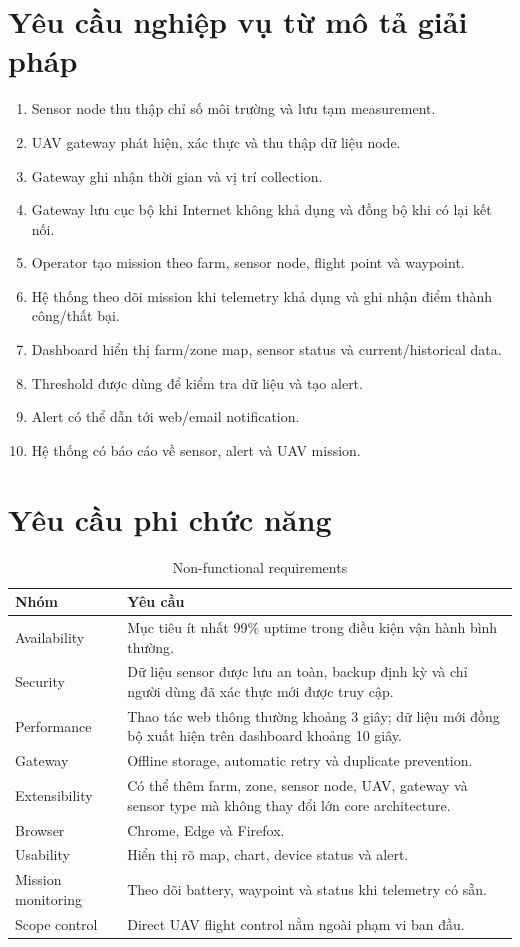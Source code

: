 \section{Yêu cầu nghiệp vụ từ mô tả giải pháp}
\begin{enumerate}
\item Sensor node thu thập chỉ số môi trường và lưu tạm measurement.
\item UAV gateway phát hiện, xác thực và thu thập dữ liệu node.
\item Gateway ghi nhận thời gian và vị trí collection.
\item Gateway lưu cục bộ khi Internet không khả dụng và đồng bộ khi có lại kết nối.
\item Operator tạo mission theo farm, sensor node, flight point và waypoint.
\item Hệ thống theo dõi mission khi telemetry khả dụng và ghi nhận điểm thành công/thất bại.
\item Dashboard hiển thị farm/zone map, sensor status và current/historical data.
\item Threshold được dùng để kiểm tra dữ liệu và tạo alert.
\item Alert có thể dẫn tới web/email notification.
\item Hệ thống có báo cáo về sensor, alert và UAV mission.
\end{enumerate}

\section{Yêu cầu phi chức năng}
\begin{table}[H]
\centering
\caption{Non-functional requirements}
\begin{tabularx}{\textwidth}{p{3.2cm}X}
\toprule
Nhóm & Yêu cầu\\
\midrule
Availability & Mục tiêu ít nhất 99\% uptime trong điều kiện vận hành bình thường.\\
Security & Dữ liệu sensor được lưu an toàn, backup định kỳ và chỉ người dùng đã xác thực mới được truy cập.\\
Performance & Thao tác web thông thường khoảng 3 giây; dữ liệu mới đồng bộ xuất hiện trên dashboard khoảng 10 giây.\\
Gateway & Offline storage, automatic retry và duplicate prevention.\\
Extensibility & Có thể thêm farm, zone, sensor node, UAV, gateway và sensor type mà không thay đổi lớn core architecture.\\
Browser & Chrome, Edge và Firefox.\\
Usability & Hiển thị rõ map, chart, device status và alert.\\
Mission monitoring & Theo dõi battery, waypoint và status khi telemetry có sẵn.\\
Scope control & Direct UAV flight control nằm ngoài phạm vi ban đầu.\\
\bottomrule
\end{tabularx}
\end{table}

